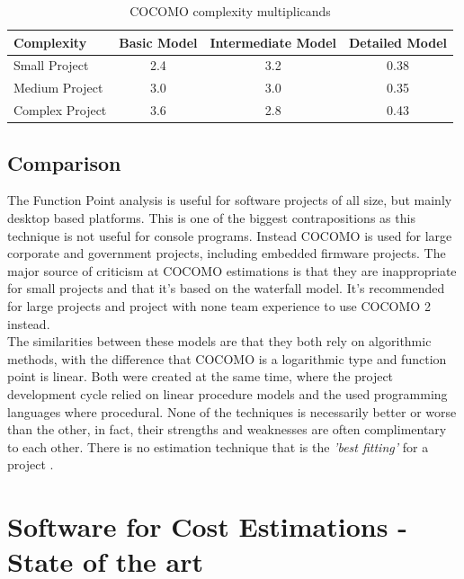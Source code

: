 \begin{table}[h]
	\centering 
	\setlength{\tabcolsep}{4pt}
	\begin{tabular}{|l|c|c|c|}\hline
		Complexity	&  Basic Model 		&  Intermediate Model	&  Detailed Model\\ \hline
		Small Project   	& 2.4      	& 3.2  					& 0.38	\\ \hline
		Medium Project 		& 3.0      	& 3.0  					& 0.35	\\ \hline
		Complex Project 	& 3.6 		& 2.8					& 0.43\\ \hline
	\end{tabular} 
	\caption{COCOMO complexity multiplicands} 
	\label{cocomo:complexity} 
\end{table}

\subsection{Comparison}

The Function Point analysis is useful for software projects of all size, but mainly desktop based platforms. This is one of the biggest contrapositions as this technique is not useful for console programs. Instead COCOMO is used for large corporate and government projects, including embedded firmware projects. The major source of criticism at COCOMO estimations is that they are inappropriate for small projects and that it's based on the waterfall model. It's recommended for large projects and project with none team experience to use COCOMO 2 instead.\\
The similarities between these models are that they both rely on algorithmic methods, with the difference that COCOMO is a logarithmic type and function point is linear. Both were created at the same time, where the project development cycle relied on linear procedure models and the used programming languages where procedural. None of the techniques is necessarily better or worse than the other, in fact, their strengths and weaknesses are often complimentary to each other. There is no estimation technique that is the \textit{'best fitting'} for a project \cite{estimationanalysis}.

\section{Software for Cost Estimations - State of the art}
\label{sec:stateofart}

